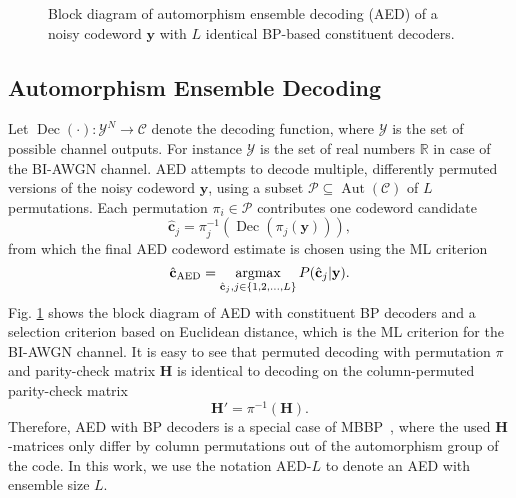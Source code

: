 \documentclass[conference]{IEEEtran}
\begin{document}
\begin{NoHyper}
\begin{figure} 
	\centering
	\resizebox{\columnwidth}{!}{}
	\caption{\footnotesize Block diagram of automorphism ensemble decoding (AED) of a noisy codeword $\mathbf{y}$ with $L$ identical BP-based constituent decoders.}
	\label{fig:Block_Diag}
	\vspace{-0.25cm}
\end{figure}


\subsection{Automorphism Ensemble Decoding}
Let $\operatorname{Dec}(\cdot): \mathcal{Y}^N \to \mathcal{C}$ denote the decoding function, where $\mathcal{Y}$ is the set of possible channel outputs. For instance $\mathcal{Y}$ is the set of real numbers $\mathbb{R}$ in case of the \ac{BI-AWGN} channel. \ac{AED} \cite{rm_automorphism_ensemble_decoding} attempts to decode multiple, differently permuted versions of the noisy codeword $\mathbf{y}$, using a subset $\mathcal{P} \subseteq \operatorname{Aut}(\mathcal{C})$ of $L$ permutations. Each permutation $\pi_i\in\mathcal{P}$ contributes one codeword candidate
\begin{equation}
    \hat{\mathbf{c}}_j=\pi_j^{-1}(\operatorname{Dec}(\pi_j(\mathbf{y}))),
\end{equation}
from which the final \ac{AED} codeword estimate is chosen using the \ac{ML} criterion
\begin{equation}
    \hat{\mathbf{c}}_\mathrm{AED} = \mathop{\mathrm{argmax}}_{\hat{\mathbf{c}}_j, j\in\{1,2,\dots,L\}} P(\hat{\mathbf{c}}_j|\mathbf{y}).
\end{equation}
Fig. \ref{fig:Block_Diag} shows the block diagram of \ac{AED} with constituent \ac{BP} decoders and a selection criterion based on Euclidean distance, which is the \ac{ML} criterion for the \ac{BI-AWGN} channel. It is easy to see that permuted decoding with permutation $\pi$ and parity-check matrix $\mathbf{H}$ is identical to decoding on the column-permuted parity-check matrix
\begin{equation}
    \mathbf{H}' = \pi^{-1}(\mathbf{H}).
\end{equation}
Therefore, \ac{AED} with \ac{BP} decoders is a special case of \ac{MBBP}~\cite{Huber}, where the used $\mathbf{H}$-matrices only differ by column permutations out of the automorphism group of the code.
In this work, we use the notation AED-$L$ to denote an \ac{AED} with ensemble size $L$.


\end{NoHyper}
\end{document}
